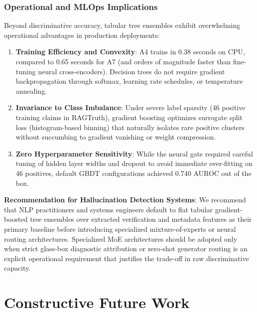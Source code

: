 \documentclass[pdflatex,sn-mathphys,Numbered]{sn-jnl}
\begin{document}
\subsubsection{Operational and MLOps Implications}
Beyond discriminative accuracy, tabular tree ensembles exhibit overwhelming operational advantages in production deployments:
\begin{enumerate}
    \item \textbf{Training Efficiency and Convexity}: A4 trains in 0.38 seconds on CPU, compared to 0.65 seconds for A7 (and orders of magnitude faster than fine-tuning neural cross-encoders). Decision trees do not require gradient backpropagation through softmax, learning rate schedules, or temperature annealing.
    \item \textbf{Invariance to Class Imbalance}: Under severe label sparsity (46 positive training claims in RAGTruth), gradient boosting optimizes surrogate split loss (histogram-based binning) that naturally isolates rare positive clusters without succumbing to gradient vanishing or weight compression.
    \item \textbf{Zero Hyperparameter Sensitivity}: While the neural gate required careful tuning of hidden layer widths and dropout to avoid immediate over-fitting on 46 positives, default GBDT configurations achieved 0.740 AUROC out of the box.
\end{enumerate}

\noindent \textbf{Recommendation for Hallucination Detection Systems}: We recommend that NLP practitioners and systems engineers default to flat tabular gradient-boosted tree ensembles over extracted verification and metadata features as their primary baseline before introducing specialized mixture-of-experts or neural routing architectures. Specialized MoE architectures should be adopted only when strict glass-box diagnostic attribution or zero-shot generator routing is an explicit operational requirement that justifies the trade-off in raw discriminative capacity.

\section{Constructive Future Work}\label{sec:future_work}
\end{document}
